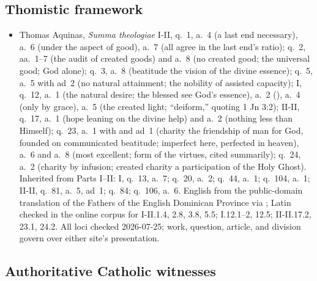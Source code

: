 \subsection*{Thomistic framework}

{\fontsize{8.6}{9.6}\selectfont
\begin{itemize}[itemsep=0pt,parsep=0pt,topsep=0.05em]
\item Thomas Aquinas, \emph{Summa theologiae} I-II, q.~1, a.~4 (a last end necessary), a.~6 (under the aspect of good), a.~7 (all agree in the last end's ratio); q.~2, aa.~1--7 (the audit of created goods) and a.~8 (no created good; the universal good; God alone); q.~3, a.~8 (beatitude the vision of the divine essence); q.~5, a.~5 with ad~2 (no natural attainment; the nobility of assisted capacity); I, q.~12, a.~1 (the natural desire; the blessed see God's essence), a.~2 (), a.~4 (only by grace), a.~5 (the created light; ``deiform,'' quoting 1 Jn 3:2); II-II, q.~17, a.~1 (hope leaning on the divine help) and a.~2 (nothing less than Himself); q.~23, a.~1 with  and ad~1 (charity the friendship of man for God, founded on communicated beatitude; imperfect here, perfected in heaven), a.~6 and a.~8 (most excellent; form of the virtues, cited summarily); q.~24, a.~2 (charity by infusion; created charity a participation of the Holy Ghost). Inherited from Parts I--II: I, q.~13, a.~7; q.~20, a.~2; q.~44, a.~1; q.~104, a.~1; II-II, q.~81, a.~5, ad~1; q.~84; q.~106, a.~6. English from the public-domain translation of the Fathers of the English Dominican Province via ; Latin checked in the  online corpus for I-II.1.4, 2.8, 3.8, 5.5; I.12.1--2, 12.5; II-II.17.2, 23.1, 24.2. All loci checked 2026-07-25; work, question, article, and division govern over either site's presentation.
\end{itemize}}

\subsection*{Authoritative Catholic witnesses}

